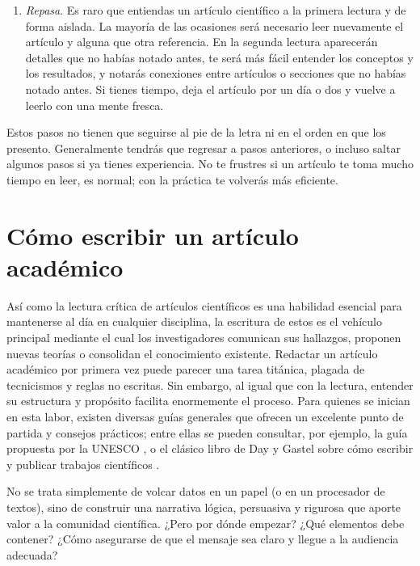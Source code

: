 \begin{enumerate}
\begin{itemize}
        \end{itemize}
  \item \emph{Repasa}. Es raro que entiendas un artículo científico a la
        primera lectura y de forma aislada.
        La mayoría de las ocasiones será necesario leer nuevamente el artículo
        y alguna que otra referencia.
        En la segunda lectura aparecerán detalles que no habías notado antes,
        te será más fácil entender los conceptos y los resultados, y notarás
        conexiones entre artículos o secciones que no habías notado antes.
        Si tienes tiempo, deja el artículo por un día o dos y vuelve a leerlo
        con una mente fresca.
\end{enumerate}

Estos pasos no tienen que seguirse al pie de la letra ni en el orden en que los
presento.
Generalmente tendrás que regresar a pasos anteriores, o incluso saltar algunos
pasos si ya tienes experiencia.
No te frustres si un artículo te toma mucho tiempo en leer, es normal; con la
práctica te volverás más eficiente.

\section{Cómo escribir un artículo académico}
\label{sec:comoescribir}

Así como la lectura crítica de artículos científicos es una habilidad esencial para
mantenerse al día en cualquier disciplina, la escritura de estos es el vehículo
principal mediante el cual los investigadores comunican sus hallazgos, proponen
nuevas teorías o consolidan el conocimiento existente.
Redactar un artículo académico por primera vez puede parecer una tarea titánica,
plagada de tecnicismos y reglas no escritas.
Sin embargo, al igual que con la lectura, entender su estructura y propósito
facilita enormemente el proceso. Para quienes se inician en esta labor, existen
diversas guías generales que ofrecen un excelente punto de partida y consejos
prácticos; entre ellas se pueden consultar, por ejemplo, la guía propuesta por
la UNESCO \cite{Unesco1983GuiaRedaccion}, o el clásico libro de Day y Gastel
sobre cómo escribir y publicar trabajos científicos
\cite{DayGastel2022HowToWrite}.

No se trata simplemente de volcar datos en un papel (o en un procesador de
textos), sino de construir una narrativa lógica, persuasiva y rigurosa que
aporte valor a la comunidad científica.
¿Pero por dónde empezar? ¿Qué elementos debe contener?
¿Cómo asegurarse de que el mensaje sea claro y llegue a la audiencia adecuada?

